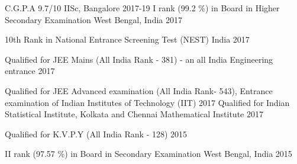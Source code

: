




\begin{cvhonors}

  \cvhonor
{C.G.P.A} %
{9.7/10} %
{IISc, Bangalore} %
{2017-19} %
  \cvhonor
    {I rank (99.2 \%) in Board} %
    {in Higher Secondary Examination} %
    {West Bengal, India} %
    {2017} %

  \cvhonor
    {10th Rank} %
    {in National Entrance Screening Test (NEST)} %
    {India} %
    {2017} %

  \cvhonor
	{} %
	{Qualified for JEE Mains (All India Rank - 381) - an all India Engineering entrance} %
	{} %
	{2017} %
	 
	\cvhonor
	{} %
	{Qualified for JEE Advanced examination (All India Rank- 543), Entrance examination of Indian Institutes of Technology (IIT)} %
	{} %
	{2017} %
  \cvhonor
    {} %
    {Qualified for Indian Statistical Institute, Kolkata and Chennai Mathematical Institute} %
    {} %
    {2017} %

  \cvhonor
    {} %
    {Qualified for K.V.P.Y (All India Rank - 128)} %
    {} %
    {2015} %

  \cvhonor
    {II rank (97.57 \%) in Board} %
    {in Secondary Examination} %
    {West Bengal, India} %
    {2015} %
    \\\\

\end{cvhonors}

